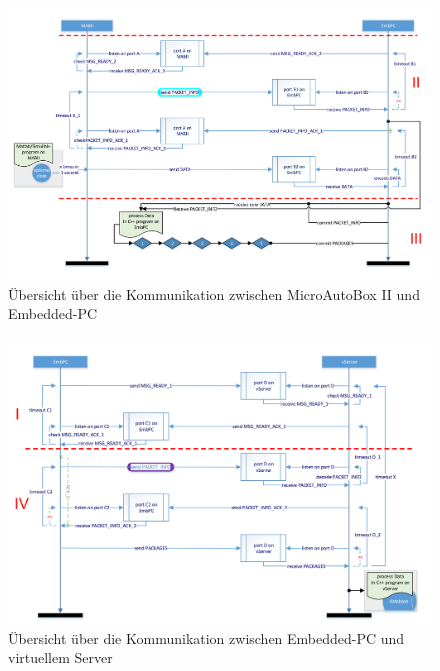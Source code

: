 \documentclass[fontsize = 12pt, paper = a4]{scrreprt}
\begin{document}

\begin{figure}
\centering
\includegraphics[scale = 0.95]{Kommunikationsaufbau_1}
\caption[Übersicht über die Kommunikation zwischen MicroAutoBox II und Embedded-PC]{Übersicht über die Kommunikation zwischen MicroAutoBox II und Embedded-PC}
\label{Kommunikationsaufbau1}
\end{figure}

\newpage

\begin{figure}
\centering
\includegraphics[scale = 0.95]{Kommunikationsaufbau_2}
\caption[Übersicht über die Kommunikation zwischen Embedded-PC und virtuellem Server]{Übersicht über die Kommunikation zwischen Embedded-PC und virtuellem Server}
\label{Kommunikationsaufbau2}
\end{figure}
\end{document}
